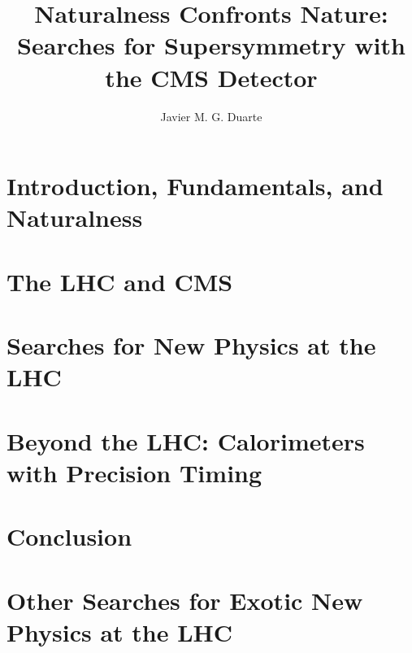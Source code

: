 \documentclass[12pt]{caltech_thesis}
\begin{document}
\author{Javier M. G. Duarte}
\title{Naturalness Confronts Nature: Searches for Supersymmetry with
  the CMS Detector}


\address{Pasadena, California}                     %



\maketitle[logo]                  %




\tableofcontents
\listoffigures
\listoftables
\printnomenclature

\mainmatter

\part{Introduction, Fundamentals, and Naturalness}
\label{part:intro}



\part{The LHC and CMS}
\label{part:lhccms}


\part{Searches for New Physics at the LHC}
\label{part:searches}


\part{Beyond the LHC: Calorimeters with Precision Timing}
\label{part:timing}

\part{Conclusion}
\label{part:conclusion}



\appendix
\part{Other Searches for Exotic New Physics at the LHC}
\label{part:app}




%

\printbibliography[heading=bibintoc]

\printindex
\end{document}
